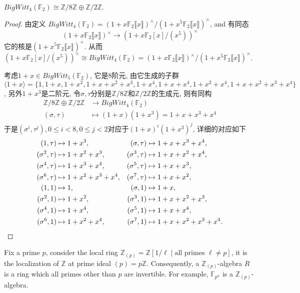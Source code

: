 \begin{example}
	$BigWitt_4(\mathbb{F}_2) \cong \mathbb{Z}/8 \mathbb{Z} \oplus \mathbb{Z}/2 \mathbb{Z}.$
\end{example}
\begin{proof}
由定义
$BigWitt_4(\mathbb{F}_2)=(1+x \mathbb{F}_2\llbracket x\rrbracket )^{\times}/(1+x^5 \mathbb{F}_2\llbracket x\rrbracket )^{\times}$, and 有同态
\[(1+x \mathbb{F}_2\llbracket x\rrbracket )^{\times} \longrightarrow (1+x \mathbb{F}_2[x]/(x^5))^{\times}\]
它的核是$(1+x^5 \mathbb{F}_2\llbracket x\rrbracket )^{\times}$.
从而$(1+x \mathbb{F}_2[x]/(x^5))^{\times} \cong BigWitt_4(\mathbb{F}_2)=(1+x \mathbb{F}_2\llbracket x\rrbracket )^{\times}/(1+x^5 \mathbb{F}_2\llbracket x\rrbracket )^{\times}$.

	考虑$1+x \in BigWitt_5(\mathbb{F}_2)$, 它是$8$阶元, 由它生成的子群$\langle 1+x \rangle = \{1,1+x,1+x^2,1+x+x^2+x^3,1+x^4,1+x+x^4,1+x^2+x^4,1+x+x^2+x^3+x^4\}$, 另外$1+x^3$是二阶元, 令$\sigma,\tau$分别是$\mathbb{Z}/8 \mathbb{Z}$和$\mathbb{Z}/2 \mathbb{Z}$的生成元, 则有同构
	\begin{align*}
	\mathbb{Z}/8 \mathbb{Z} \oplus \mathbb{Z}/2 \mathbb{Z} &\longrightarrow BigWitt_4(\mathbb{F}_2) \\
	(\sigma,\tau) & \mapsto (1+x)(1+x^3)=1+x+x^3+x^4 
	\end{align*}
	于是$(\sigma^i,\tau^j), 0\leq i <8, 0\leq j<2$对应于$(1+x)^i(1+x^3)^j$, 详细的对应如下
	\begin{align*}
	(1,\tau) & \mapsto 1+x^3,& (\sigma,\tau) & \mapsto 1+x+x^3+x^4, \\
	 (\sigma^2,\tau) & \mapsto 1+x^2+x^3,& (\sigma^3,\tau) & \mapsto 1+x+x^2+x^4, \\
	(\sigma^4,\tau) & \mapsto 1+x^3+x^4, & (\sigma^5,\tau) & \mapsto 1+x+x^3, \\
	 (\sigma^6,\tau) & \mapsto 1+x^2+x^3+x^4, & (\sigma^7,\tau) & \mapsto 1+x+x^2, \\
	(1,1)& \mapsto 1,& (\sigma,1) & \mapsto 1+x, \\
	(\sigma^2,1) & \mapsto 1+x^2, & (\sigma^3,1) & \mapsto 1+x+x^2+x^3, \\
	(\sigma^4,1) & \mapsto 1+x^4, &
	(\sigma^5,1) & \mapsto 1+x+x^4, \\
	(\sigma^6,1) & \mapsto 1+x^2+x^4, & (\sigma^7,1) & \mapsto 1+x+x^2+x^3+x^4. \qedhere
	\end{align*}
\end{proof}



Fix a prime $p$, consider the local ring $\mathbb{Z}_{(p)}=\mathbb{Z}[1/\ell \mid \text{all primes }\ell\neq p]$, it is the localization of $\mathbb{Z}$ at prime ideal $(p)=p \mathbb{Z}$. Consequently, a $\mathbb{Z}_{(p)}$-algebra $R$ is a ring which all primes other than $p$ are invertible. For example, $\mathbb{F}_{p^n}$ is a $\mathbb{Z}_{(p)}$-algebra. 

